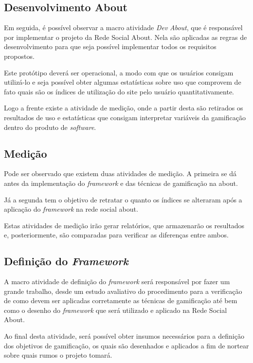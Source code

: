 \subsection{Desenvolvimento About}
\label{sub:Desenvolvimentoabout}
Em seguida, é possível observar a macro atividade \textit{Dev} \textit{About}, que é responsável
por implementar o projeto da Rede Social About.
Nela são aplicadas as
regras de desenvolvimento para que seja possível implementar todos os
requisitos propostos.

Este protótipo deverá ser operacional, a modo com que os usuários consigam
utilizá-lo e seja possível obter algumas estatísticas sobre uso que comprovem
de fato quais são os índices de utilização do site pelo usuário quantitativamente.

Logo a frente existe a atividade de medição, onde a partir desta são retirados
os resultados de uso e estatísticas que consigam interpretar variáveis da gamificação
dentro do produto de \textit{software}. 

\subsection{Medição}
\label{sub:medicao}
Pode ser observado que existem duas atividades de medição. A primeira se dá
antes da implementação do \textit{framework}  e das técnicas de gamificação na about.

Já a segunda tem o objetivo de retratar o quanto os índices se alteraram após
a aplicação do \textit{framework} na rede social about.

Estas atividades de medição irão gerar relatórios, que armazenarão os resultados
e, posteriormente, são comparadas para verificar as diferenças entre ambos.

\subsection{Definição do \textit{Framework}}
\label{sub:definicaoframework}
A macro atividade de definição do \textit{framework} será responsável por fazer um grande
trabalho, desde um estudo avaliativo do procedimento para a verificação de como
devem ser aplicadas corretamente as técnicas de gamificação até bem como o desenho
do \textit{framework} que será utilizado e aplicado na Rede Social About.

Ao final desta atividade, será possível obter insumos necessários para a definição
dos objetivos de gamificação, os quais são desenhados e aplicados a fim
de nortear sobre quais rumos o projeto tomará.

